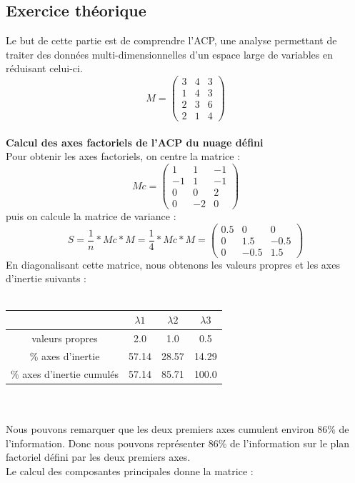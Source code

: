 \documentclass[a4paper, 9pt]{article}
\begin{document}
\subsection{Exercice th\'eorique}

Le but de cette partie est de comprendre l'ACP, une analyse permettant de traiter des donn\'ees multi-dimensionnelles d'un espace
large de variables en r\'eduisant celui-ci.
\[M =
\begin{pmatrix}
3 & 4 & 3\\
1 & 4 & 3\\
2 & 3 & 6\\
2 & 1 & 4
\end{pmatrix}\]\\
\textbf{Calcul des axes factoriels de l'ACP du nuage d\'efini}\\
Pour obtenir les axes factoriels, on centre la matrice :
\[Mc =
\begin{pmatrix}
1 & 1 & -1\\
-1 & 1 & -1\\
0 & 0 & 2\\
0 & -2 & 0
\end{pmatrix}\]
puis on calcule la matrice de variance :
\[S = \frac{1}{n}*Mc*M = \frac{1}{4}*Mc*M =
\begin{pmatrix}
0.5 & 0 & 0\\
0 & 1.5 & -0.5\\
0 & -0.5 & 1.5
\end{pmatrix}\]
En diagonalisant cette matrice, nous obtenons les valeurs propres et les axes d'inertie suivants :\\ \\
\begin{tabular}{|c|c|c|c|}
\hline
 & $\lambda1$ & $\lambda2$ & $\lambda3$\\
\hline
valeurs propres & 2.0 & 1.0 & 0.5\\
\hline
\% axes d'inertie & 57.14 & 28.57 & 14.29\\
\hline
\% axes d'inertie cumul\'es & 57.14 & 85.71 & 100.0\\
\hline
\end{tabular}\\ \\
Nous pouvons remarquer que les deux premiers axes cumulent environ 86\% de l'information.
Donc nous pouvons repr\'esenter 86\% de l'information sur le plan factoriel d\'efini par les deux premiers axes.\\
Le calcul des composantes principales donne la matrice :\\
\end{document}
